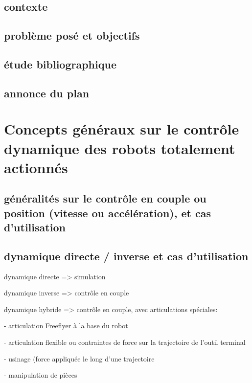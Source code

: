 \documentclass{report}
\begin{document}
\section*{contexte}


\section*{problème posé et objectifs}


\section*{étude bibliographique}


\section*{annonce du plan}


\chapter{Concepts généraux sur le contrôle dynamique des robots totalement actionnés}

\section{généralités sur le contrôle en couple ou position (vitesse ou accélération), et cas d'utilisation}

\section{dynamique directe / inverse et cas d'utilisation}

dynamique directe => simulation
\vspace{0.3cm}

dynamique inverse => contrôle en couple
\vspace{0.3cm}

dynamique hybride => contrôle en couple, avec articulations spéciales:
\vspace{0.3cm}

	- articulation Freeflyer à la base du robot

	- articulation flexible	ou contraintes de force sur la trajectoire de l'outil terminal
	
	- usinage (force appliquée le long d'une trajectoire
	
	- manipulation de pièces
\end{document}
